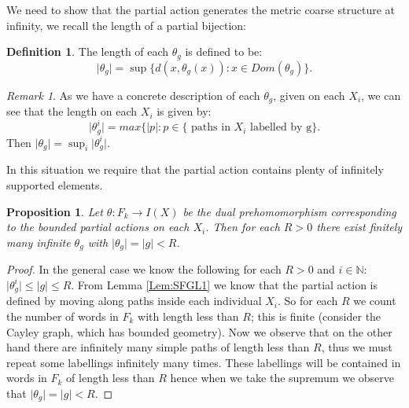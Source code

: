 \documentclass[11pt]{amsart}
\theoremstyle{plain}
\newtheorem{proposition}[theorem]{Proposition}%
\theoremstyle{definition}%
\newtheorem{definition}[theorem]{Definition}%
\theoremstyle{remark}%
\newtheorem{remark}[theorem]{Remark}%
\begin{document}
We need to show that the partial action generates the metric coarse structure at infinity, we recall the length of a partial bijection:

\begin{definition}
The length of each $\theta_{g}$ is defined to be:
\begin{equation*}
\vert \theta_{g} \vert = \sup \lbrace d(x,\theta_{g}(x)) : x \in Dom(\theta_{g})\rbrace.
\end{equation*} 
\end{definition}

\begin{remark}
As we have a concrete description of each $\theta_{g}$, given on each $X_{i}$, we can see that the length on each $X_{i}$ is given by:
\begin{equation*}
\vert \theta_{g}^{i} \vert = max\lbrace \vert p \vert: p \in \lbrace \mbox{ paths in }X_{i}\mbox{ labelled by g}\rbrace.
\end{equation*} Then $\vert \theta_{g} \vert = \sup_{i} \vert \theta_{g}^{i} \vert$.
\end{remark}

In this situation we require that the partial action contains plenty of infinitely supported elements. 

\begin{proposition}\label{Prop:Inf}
Let $\theta: F_{k} \rightarrow I(X)$ be the dual prehomomorphism corresponding to the bounded partial actions on each $X_{i}$. Then for each $R>0$ there exist finitely many infinite $\theta_{g}$ with $\vert \theta_{g} \vert = \vert g \vert < R$. 
\end{proposition}
\begin{proof}

In the general case we know the following for each $R>0$ and $i \in \mathbb{N}$: $\vert \theta_{g}^{i} \vert \leq \vert g \vert \leq R$. From Lemma \ref{Lem:SFGL1} we know 
that the partial action is defined by moving along paths inside each individual $X_{i}$. So for each $R$ we count the number of words in $F_{k}$ with length less than $R$; this is finite (consider the Cayley graph, which has bounded geometry). Now we observe that on the other hand there are infinitely many simple paths of length less than $R$, thus we must repeat some labellings infinitely many times. These labellings will be contained in words in $F_{k}$ of length less than $R$ hence when we take the supremum we observe that $\vert \theta_{g} \vert = \vert g \vert < R$. \end{proof}
\end{document}
